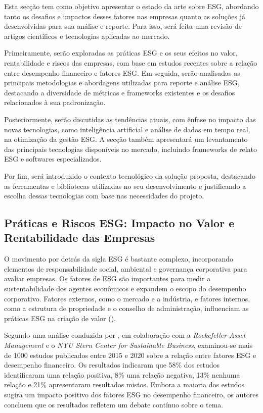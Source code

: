 Esta secção tem como objetivo apresentar o estado da arte sobre ESG, abordando tanto os desafios e impactos desses fatores nas empresas quanto as soluções já desenvolvidas para sua análise e reporte. Para isso, será feita uma revisão de artigos científicos e tecnologias aplicadas ao mercado.  

Primeiramente, serão exploradas as práticas ESG e os seus efeitos no valor, rentabilidade e riscos das empresas, com base em estudos recentes sobre a relação entre desempenho financeiro e fatores ESG. Em seguida, serão analisadas as principais metodologias e abordagens utilizadas para reporte e análise ESG, destacando a diversidade de métricas e frameworks existentes e os desafios relacionados à sua padronização.  

Posteriormente, serão discutidas as tendências atuais, com ênfase no impacto das novas tecnologias, como inteligência artificial e análise de dados em tempo real, na otimização da gestão ESG. A secção também apresentará um levantamento das principais tecnologias disponíveis no mercado, incluindo frameworks de relato ESG e softwares especializados.  

Por fim, será introduzido o contexto tecnológico da solução proposta, destacando as ferramentas e bibliotecas utilizadas no seu desenvolvimento e justificando a escolha dessas tecnologias com base nas necessidades do projeto.


\subsection{Práticas e Riscos ESG: Impacto no Valor e Rentabilidade das Empresas}
\label{subsec:PESGE}

O movimento por detrás da sigla ESG é bastante complexo, incorporando elementos de responsabilidade social, ambiental e governança corporativa para avaliar empresas. Os fatores de \gls{ESG} são importantes para medir a sustentabilidade dos agentes econômicos e expandem o escopo do desempenho corporativo. Fatores externos, como o mercado e a indústria, e fatores internos, como a estrutura de propriedade e o conselho de administração, influenciam as práticas ESG na criação de valor (\cite{Wang2023}).

Segundo uma análise conduzida por \cite{Whelan2021}, em colaboração com a \textit{Rockefeller Asset Management} e o \textit{NYU Stern Center for Sustainable Business}, examinou-se mais de 1000 estudos publicados entre 2015 e 2020 sobre a relação entre fatores ESG e desempenho financeiro. Os resultados indicaram que 58\% dos estudos identificaram uma relação positiva, 8\% uma relação negativa, 13\% nenhuma relação e 21\% apresentaram resultados mistos. Embora a maioria dos estudos sugira um impacto positivo dos fatores ESG no desempenho financeiro, os autores concluem que os resultados refletem um debate contínuo sobre o tema.

